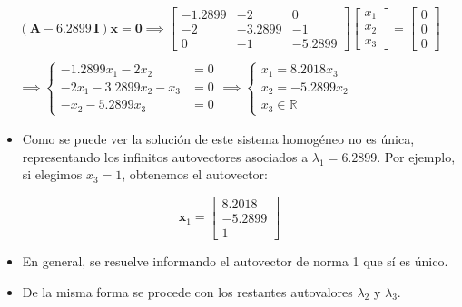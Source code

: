 \documentclass[openany]{book}
\providecommand{\tightlist}{%
  \setlength{\itemsep}{0pt}\setlength{\parskip}{0pt}}
\begin{document}
\begin{gather*}
(\textbf{A} - 6.2899 \, \textbf{I}) \textbf{x} = \textbf{0} \implies 
\begin{bmatrix}
    -1.2899 & -2 & 0 \\ 
    -2 & -3.2899 & -1 \\
    0 & -1 & -5.2899
\end{bmatrix}
\begin{bmatrix}
    x_1 \\ x_2 \\ x_3
\end{bmatrix} 
=
\begin{bmatrix}
    0 \\ 0 \\ 0
\end{bmatrix}
\\ \\
\implies
\begin{cases}
-1.2899 x_1 -2 x_2 &= 0 \\
-2 x_1 - 3.2899 x_2 - x_3 &= 0\\
-x_2 - 5.2899 x_3 &= 0
\end{cases} \implies
\begin{cases}
    x_1 = 8.2018 x_3\\
    x_2 = -5.2899 x_2\\
    x_3 \in \mathbb{R} 
\end{cases}
\end{gather*}

\begin{itemize}
\tightlist
\item
  Como se puede ver la solución de este sistema homogéneo no es única, representando los infinitos autovectores asociados a \(\lambda_1 = 6.2899\). Por ejemplo, si elegimos \(x_3 = 1\), obtenemos el autovector:
\end{itemize}

\[
\textbf{x}_1 = 
\begin{bmatrix}
    8.2018 \\ -5.2899 \\ 1
\end{bmatrix} 
\]

\begin{itemize}
\tightlist
\item
  En general, se resuelve informando el autovector de norma 1 que sí es único.
\item
  De la misma forma se procede con los restantes autovalores \(\lambda_2\) y \(\lambda_3\).
\end{itemize}
\end{document}
